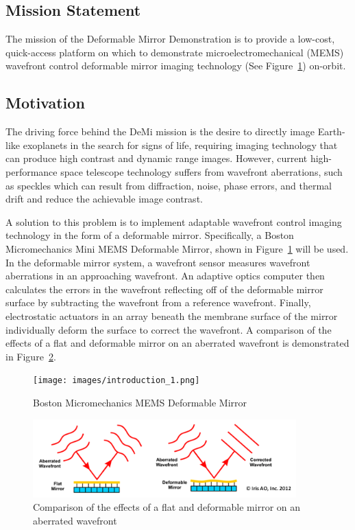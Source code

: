 \documentclass[12pt]{article}
\begin{document}
\subsection{Mission Statement}
The mission of the Deformable Mirror Demonstration is to provide a low-cost, quick-access platform on which to demonstrate microelectromechanical (MEMS) wavefront control deformable mirror imaging technology (See Figure~\ref{fig:Intro_demi}) on-orbit.



\subsection{Motivation}
The driving force behind the DeMi mission is the desire to directly image Earth-like exoplanets in the search for signs of life, requiring imaging technology that can produce high contrast and dynamic range images.  However, current high-performance space telescope technology suffers from wavefront aberrations, such as speckles which can result from diffraction, noise, phase errors, and thermal drift and reduce the achievable image contrast.\cite{cahoy-unpublished}

A solution to this problem is to implement adaptable wavefront control imaging technology in the form of a deformable mirror. Specifically, a Boston Micromechanics
Mini MEMS Deformable Mirror, shown in Figure~\ref{fig:Intro_demi} will be used. In the deformable mirror system, a wavefront sensor measures wavefront aberrations in an approaching wavefront. An adaptive optics computer then calculates the errors in the wavefront reflecting off of the deformable mirror surface by subtracting the wavefront from a reference wavefront.\cite{adaptive-optics-overview} Finally, electrostatic actuators in an array beneath the membrane surface of the mirror individually deform the surface to correct the wavefront. A comparison of the effects of a flat and deformable mirror on an aberrated wavefront is demonstrated in Figure~\ref{fig:Intro_wavefront}.   

\begin{figure}[!ht]
\centering
\texttt{[image: images/introduction\_1.png]}
\caption{Boston Micromechanics MEMS Deformable Mirror\cite{bos-micro-demi}}
\label{fig:Intro_demi}
\end{figure}

\begin{figure}[!ht]
\centering
\includegraphics[width=4in]{images/introduction_2.png}
\caption{Comparison of the effects of a flat and deformable mirror on an aberrated wavefront}
\label{fig:Intro_wavefront}
\end{figure}
\end{document}
